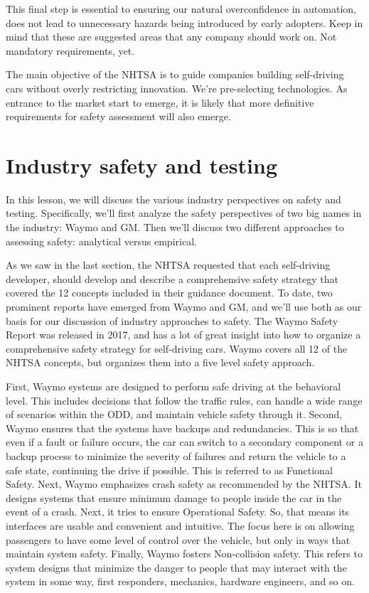 This final step is essential to ensuring our natural overconfidence in automation, does not lead to unnecessary hazards being introduced by early adopters. 
Keep in mind that these are suggested areas that any company should work on. Not mandatory requirements, yet. 

The main objective of the NHTSA is to guide companies building self-driving cars without overly restricting innovation. 
We're pre-selecting technologies. As entrance to the market start to emerge, it is likely that more definitive requirements for safety 
assessment will also emerge. 
 

\section{Industry safety and testing}

In this lesson, we will discuss the various industry perspectives on safety and testing. 
Specifically, we'll first analyze the safety perspectives of two big names in the industry: Waymo and GM. 
Then we'll discuss two different approaches to assessing safety: analytical versus empirical. 

As we saw in the last section, the NHTSA requested that each self-driving developer, should develop and describe a 
comprehensive safety strategy that covered the 12 concepts included in their guidance document. 
To date, two prominent reports have emerged from Waymo and GM, and we'll use both as our basis 
for our discussion of industry approaches to safety. 
The Waymo Safety Report was released in 2017, and has a lot of great insight into how to organize a 
comprehensive safety strategy for self-driving cars. 
Waymo covers all 12 of the NHTSA concepts, but organizes them into a five level safety approach. 

First, Waymo systems are designed to perform safe driving at the behavioral level. 
This includes decisions that follow the traffic rules, can handle a wide range of scenarios within the ODD, and maintain vehicle safety through it. 
Second, Waymo ensures that the systems have backups and redundancies. This is so that even if a fault or failure occurs, the car can switch to a 
secondary component or a backup process to minimize the severity of failures and return the vehicle to a 
safe state, continuing the drive if possible. 
This is referred to as Functional Safety. 
Next, Waymo emphasizes crash safety as recommended by the NHTSA. 
It designs systems that ensure minimum damage to people inside the car in the event of a crash. 
Next, it tries to ensure Operational Safety. So, that means its interfaces are usable and convenient and intuitive. 
The focus here is on allowing passengers to have some level of control over the vehicle, but only in ways that maintain system safety. 
Finally, Waymo fosters Non-collision safety. This refers to system designs that minimize the danger to people that may interact with the system in some way, 
first responders, mechanics, hardware engineers, and so on. 

